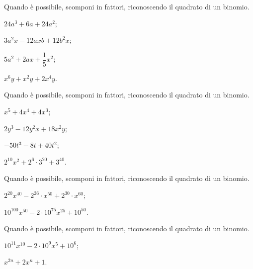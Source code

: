\begin{multicols}{2}
\begin{esercizio}[\Ast]
\label{ese:16.9}
Quando è possibile, scomponi in fattori, riconoscendo il quadrato di un binomio.
\begin{enumeratea}
 \item $24a^{3}+6a+24a^{2}$;
 \item $3a^{2}x-12axb+12b^{2}x$;
 \item $5a^{2}+2ax+\dfrac{1}{5}x^{2}$;
 \item $x^{6}y+x^{2}y+2x^{4}y$.
\end{enumeratea}
\end{esercizio}

\begin{esercizio}[\Ast]
\label{ese:16.10}
Quando è possibile, scomponi in fattori, riconoscendo il quadrato di un binomio.
\begin{enumeratea}
 \item $x^{5}+4x^{4}+4x^{3}$;
 \item $2y^{3}-12y^{2}x+18x^{2}y$;
 \item $-50t^{3}-8t+40t^{2}$;
 \item $2^{10}x^{2}+2^{6}\cdot 3^{20}+3^{40}$.
\end{enumeratea}
\end{esercizio}

\begin{esercizio}[\Ast]
\label{ese:16.11}
Quando è possibile, scomponi in fattori, riconoscendo il quadrato di un binomio.
\begin{enumeratea}
 \item $2^{20}x^{40}-2^{26}\cdot x^{50}+2^{30}\cdot x^{60}$;
 \item $10^{100}x^{50}-2\cdot 10^{75}x^{25}+10^{50}$.
\end{enumeratea}
\end{esercizio}

\begin{esercizio}[\Ast]
\label{ese:16.12}
Quando è possibile, scomponi in fattori, riconoscendo il quadrato di un binomio.
\begin{enumeratea}
 \item $10^{11}x^{10}-2\cdot 10^{9}x^{5}+10^{6}$;
 \item $x^{2n}+2x^{n}+1$.
\end{enumeratea}
\end{esercizio}
\end{multicols}

